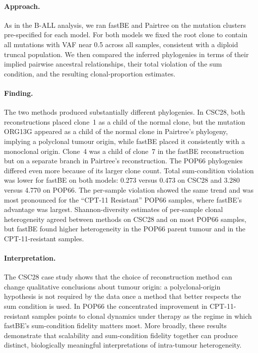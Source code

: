 \documentclass[11pt]{article}
\begin{document}
\paragraph{Approach.}
As in the B-ALL analysis, we ran fastBE and Pairtree on the mutation clusters pre-specified for each model. For both models we fixed the root clone to contain all mutations with VAF near 0.5 across all samples, consistent with a diploid truncal population. We then compared the inferred phylogenies in terms of their implied pairwise ancestral relationships, their total violation of the sum condition, and the resulting clonal-proportion estimates.

\paragraph{Finding.}
The two methods produced substantially different phylogenies. In CSC28, both reconstructions placed clone~1 as a child of the normal clone, but the mutation ORG13G appeared as a child of the normal clone in Pairtree's phylogeny, implying a polyclonal tumour origin, while fastBE placed it consistently with a monoclonal origin. Clone~4 was a child of clone~7 in the fastBE reconstruction but on a separate branch in Pairtree's reconstruction. The POP66 phylogenies differed even more because of its larger clone count. Total sum-condition violation was lower for fastBE on both models: 0.273 versus 0.473 on CSC28 and 3.280 versus 4.770 on POP66. The per-sample violation showed the same trend and was most pronounced for the ``CPT-11 Resistant'' POP66 samples, where fastBE's advantage was largest. Shannon-diversity estimates of per-sample clonal heterogeneity agreed between methods on CSC28 and on most POP66 samples, but fastBE found higher heterogeneity in the POP66 parent tumour and in the CPT-11-resistant samples.

\paragraph{Interpretation.}
The CSC28 case study shows that the choice of reconstruction method can change qualitative conclusions about tumour origin: a polyclonal-origin hypothesis is not required by the data once a method that better respects the sum condition is used. In POP66 the concentrated improvement in CPT-11-resistant samples points to clonal dynamics under therapy as the regime in which fastBE's sum-condition fidelity matters most. More broadly, these results demonstrate that scalability and sum-condition fidelity together can produce distinct, biologically meaningful interpretations of intra-tumour heterogeneity.
\end{document}
